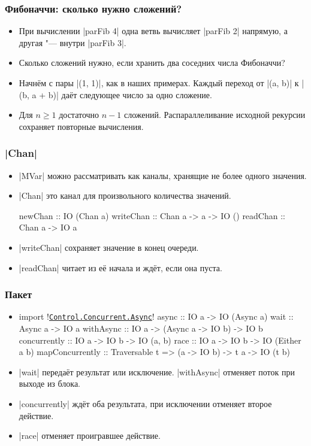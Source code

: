 \documentclass[11pt]{beamer}
\begin{document}
\begin{frame}[fragile]
  \frametitle{Фибоначчи: сколько нужно сложений?}
  \begin{itemize}
    \item При вычислении \haskinline|parFib 4| одна ветвь вычисляет \haskinline|parFib 2| напрямую, а другая "--- внутри \haskinline|parFib 3|.
    \item Сколько сложений нужно, если хранить два соседних числа Фибоначчи? \pause
    \item Начнём с пары \haskinline|(1, 1)|, как в наших примерах. Каждый переход от \haskinline|(a, b)| к \haskinline|(b, a + b)| даёт следующее число за одно сложение.
    \item Для $n \ge 1$ достаточно $n-1$ сложений. Распараллеливание исходной рекурсии сохраняет повторные вычисления.
  \end{itemize}
\end{frame}

\begin{frame}[fragile]
  \frametitle{\haskinline|Chan|}
  \begin{itemize}
    \item \haskinline|MVar| можно рассматривать как каналы, хранящие не более одного значения.
    \item \haskinline|Chan| это канал для произвольного количества значений.
          \begin{haskell}
        newChan :: IO (Chan a)
        writeChan :: Chan a -> a -> IO () 
        readChan :: Chan a -> IO a
    \end{haskell}
    \item \haskinline|writeChan| сохраняет значение в конец очереди.
    \item \haskinline|readChan| читает из её начала и ждёт, если она пуста.
  \end{itemize}
\end{frame}

\begin{frame}[fragile]
  \frametitle{Пакет }
  \begin{itemize}
    \item[]
          \begin{haskellsmall}
            import !\href{https://hackage.haskell.org/package/async/docs/Control-Concurrent-Async.html}{\texttt{Control.Concurrent.Async}}!
            async :: IO a -> IO (Async a)
            wait  :: Async a -> IO a
            withAsync :: IO a -> (Async a -> IO b) -> IO b
            concurrently :: IO a -> IO b -> IO (a, b)
            race :: IO a -> IO b -> IO (Either a b)
            mapConcurrently :: Traversable t =>
              (a -> IO b) -> t a -> IO (t b)
          \end{haskellsmall}
    \item \haskinline|wait| передаёт результат или исключение. \haskinline|withAsync| отменяет поток при выходе из блока.
    \item \haskinline|concurrently| ждёт оба результата, при исключении отменяет второе действие.
    \item \haskinline|race| отменяет проигравшее действие.
  \end{itemize}
\end{frame}
\end{document}
